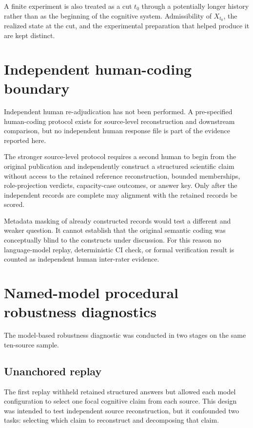 \documentclass[11pt]{article}
\begin{document}
A finite experiment is also treated as a cut \(t_0\) through a potentially longer history rather than as the beginning of the cognitive system. Admissibility of \(X_{t_0}\), the realized state at the cut, and the experimental preparation that helped produce it are kept distinct.

\section{Independent human-coding boundary}

Independent human re-adjudication has not been performed. A pre-specified human-coding protocol exists for source-level reconstruction and downstream comparison, but no independent human response file is part of the evidence reported here.

The stronger source-level protocol requires a second human to begin from the original publication and independently construct a structured scientific claim without access to the retained reference reconstruction, bounded memberships, role-projection verdicts, capacity-case outcomes, or answer key. Only after the independent records are complete may alignment with the retained records be scored.

Metadata masking of already constructed records would test a different and weaker question. It cannot establish that the original semantic coding was conceptually blind to the constructs under discussion. For this reason no language-model replay, deterministic CI check, or formal verification result is counted as independent human inter-rater evidence.

\section{Named-model procedural robustness diagnostics}

The model-based robustness diagnostic was conducted in two stages on the same ten-source sample.

\subsection{Unanchored replay}

The first replay withheld retained structured answers but allowed each model configuration to select one focal cognitive claim from each source. This design was intended to test independent source reconstruction, but it confounded two tasks: selecting which claim to reconstruct and decomposing that claim.
\end{document}
